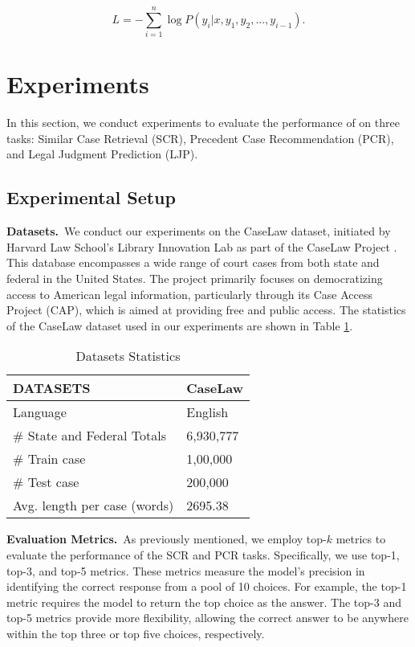 \begin{equation}
\label{eq:1}
L = -\sum_{i=1}^{n} \log P(y_i | x, y_1, y_2, ..., y_{i-1}).
\end{equation}

\section{Experiments}

In this section, we conduct experiments to evaluate the performance of \sysname on three tasks: Similar Case Retrieval (SCR), Precedent Case Recommendation (PCR), and Legal Judgment Prediction (LJP).

\subsection{Experimental Setup}

\vspace{3pt}\noindent\textbf{Datasets.}\,
We conduct our experiments on the CaseLaw dataset, initiated by Harvard Law School's Library Innovation Lab as part of the CaseLaw Project \cite{caselawproject}. This database encompasses a wide range of court cases from both state and federal in the United States. The project primarily focuses on democratizing access to American legal information, particularly through its Case Access Project (CAP), which is aimed at providing free and public access. The statistics of the CaseLaw dataset used in our experiments are shown in Table \ref{tab:dataset}.

\begin{table}[h]
\centering
\caption{Datasets Statistics}
\label{tab:dataset}
\begin{tabular}{ll}
\hline
DATASETS                         & CaseLaw \\ \hline
Language                         & English \\
\# State and Federal Totals      & 6,930,777 \\
\# Train case                    & 1,00,000  \\
\# Test case                     & 200,000   \\
Avg. length per case (words)     & 2695.38 \\
\hline
\end{tabular}
\end{table}

\vspace{3pt}\noindent\textbf{Evaluation Metrics.}\,
As previously mentioned, we employ top-$k$ metrics to evaluate the performance of the SCR and PCR tasks. Specifically, we use top-1, top-3, and top-5 metrics. These metrics measure the model's precision in identifying the correct response from a pool of 10 choices. For example, the top-1 metric requires the model to return the top choice as the answer. The top-3 and top-5 metrics provide more flexibility, allowing the correct answer to be anywhere within the top three or top five choices, respectively.

